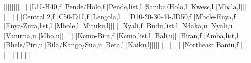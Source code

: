 \documentclass[landscape]{standalone}
\begin{document}
\begin{forest}
													[Tio/East Teke,l
													[Kukya/South Teke,l
													[Fuumu-Wuumu,l
													[Tiene,u
													[Mfinu,l
													[Mpuono,l]]]]]]]]]
												]%
											]%
											[L10-H40,f
												[Pende/Holo,f
													[Pende,list,l
													[Samba/Holo,l
													[Kwese,l
													[Mbala,l]]]]
												]%
											]%
										]%
									]%
									[Central 2,f
										[C50-D10,f
											[Lengola,l]
										]%
										[D10-20-30-40-JD50,f
											[Mbole-Enya,f
												[Enya-Zura,list,l
												[Mbole,l
												[Mituku,l]]]
											]%
											[Nyali,f
												[Budu,list,l
												[Ndaka,u
												[Nyali,u
												[Vanuma,u
												[Mbo,u]]]]]
											]%
											[Komo-Bira,f
												[Komo,list,l
												[Bali,u]]
												[Biran,f
													[Amba,list,l
													[Bhele/Piri,u
													[Bila/Kango/Sua,u
													[Bera,l
													[Kaiku,l]]]]]
												]%
											]%
										]%
									]%
								]%
								[Northeast Bantu,f
								]
							]%
						]%
					]%
				]%
			]%
		]%
	]%
]%
\end{forest}
\end{document}
